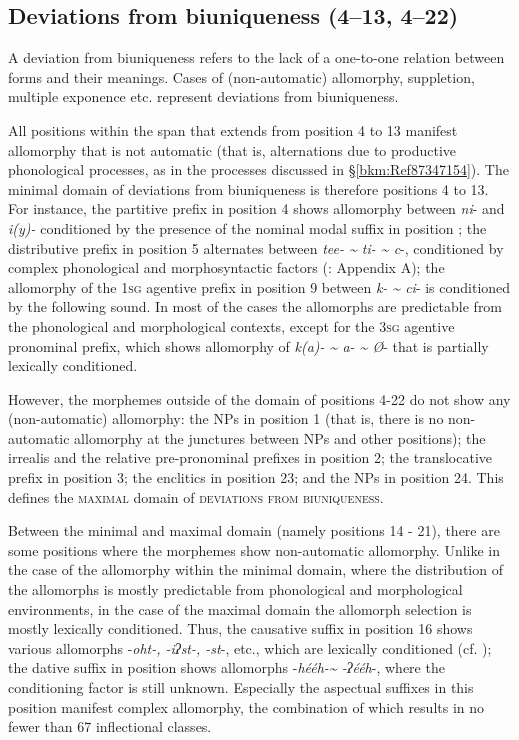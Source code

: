 \documentclass[output=paper]{langscibook}
\begin{document}
\subsection{Deviations from biuniqueness (4--13, 4--22)}
\label{bkm:Ref72232968}
A deviation from biuniqueness refers to the lack of a one-to-one relation between forms and their meanings. Cases of (non-automatic) allomorphy, suppletion, multiple exponence etc. represent deviations from biuniqueness. 

All positions within the span that extends from position 4 to 13 manifest allomorphy that is not automatic (that is, alternations due to productive phonological processes, as in the processes discussed in §\ref{bkm:Ref87347154}). The minimal domain of deviations from biuniqueness is therefore positions 4 to 13. For instance, the partitive prefix in position 4 shows allomorphy between \textit{ni}- and \textit{i(y)-} conditioned by the presence of the nominal modal suffix in position  \citep[64]{Cook1979}; the distributive prefix in position 5 alternates between \textit{tee- {\textasciitilde} ti- {\textasciitilde} c}{}-, conditioned by complex phonological and morphosyntactic factors (\citealt{uchihara2016tone}: Appendix A); the allomorphy of the \textsc{1sg} agentive prefix in position 9 between \textit{k- {\textasciitilde} ci}{}- is conditioned by the following sound. In most of the cases the allomorphs are predictable from the phonological and morphological contexts, except for the \textsc{3sg} agentive pronominal prefix, which shows allomorphy of \textit{k(a)- {\textasciitilde} a- {\textasciitilde} Ø}{}- that is partially lexically conditioned.

However, the morphemes outside of the domain of positions 4-22 do not show any (non-automatic) allomorphy: the NPs in position 1 (that is, there is no non-automatic allomorphy at the junctures between NPs and other positions); the irrealis and the relative pre-pronominal prefixes in position 2; the translocative prefix in position 3; the enclitics in position 23; and the NPs in position 24. This defines the \textsc{maximal} domain of \textsc{deviations} \textsc{from} \textsc{biuniqueness}.

Between the minimal and maximal domain (namely positions 14 - 21), there are some positions where the morphemes show non-automatic allomorphy. Unlike in the case of the allomorphy within the minimal domain, where the distribution of the allomorphs is mostly predictable from phonological and morphological environments, in the case of the maximal domain the allomorph selection is mostly lexically conditioned. Thus, the causative suffix in position 16 shows various allomorphs -\textit{oht-, -iʔst-, -st}{}-, etc., which are lexically conditioned (cf. \citealt{Mithun2000}); the dative suffix in position  shows allomorphs -\textit{hééh-{\textasciitilde} -ʔééh}{}-, where the conditioning factor is still unknown. Especially the aspectual suffixes in this position manifest complex allomorphy, the combination of which results in no fewer than 67 inflectional classes.
\end{document}
